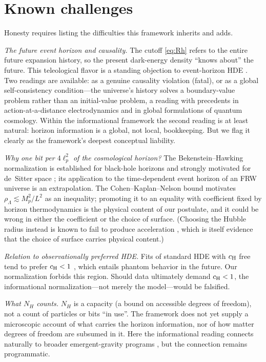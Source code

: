 \documentclass[11pt,a4paper]{article}
\begin{document}
\section{Known challenges}
\label{sec:challenges}

Honesty requires listing the difficulties this framework inherits and adds.

\emph{The future event horizon and causality.} The cutoff \eqref{eq:Rh}
refers to the entire future expansion history, so the present dark-energy
density ``knows about'' the future. This teleological flavor is a standing
objection to event-horizon HDE \citep{Cai2007,WangReview2017}. Two readings
are available: as a genuine causality violation (fatal), or as a global
self-consistency condition---the universe's history solves a boundary-value
problem rather than an initial-value problem, a reading with precedents in
action-at-a-distance electrodynamics and in global formulations of quantum
cosmology. Within the informational framework the second reading is at least
natural: horizon information is a global, not local, bookkeeping. But we
flag it clearly as the framework's deepest conceptual liability.

\emph{Why one bit per $4\ell_p^2$ of the cosmological horizon?} The
Bekenstein--Hawking normalization is established for black-hole horizons and
strongly motivated for de~Sitter space \citep{GibbonsHawking1977}; its
application to the time-dependent event horizon of an FRW universe is an
extrapolation. The Cohen--Kaplan--Nelson bound \citep{CKN1999} motivates
$\rho_\Lambda \lesssim M_p^2/L^2$ as an inequality; promoting it to an
equality with coefficient fixed by horizon thermodynamics is the physical
content of our postulate, and it could be wrong in either the coefficient or
the choice of surface. (Choosing the Hubble radius instead is known to fail
to produce acceleration \citep{Hsu2004}, which is itself evidence that the
choice of surface carries physical content.)

\emph{Relation to observationally preferred HDE.} Fits of standard HDE with
$c_{\rm H}$ free tend to prefer $c_{\rm H}<1$
\citep{HuangLi2004,WangReview2017}, which entails phantom behavior in the
future. Our normalization forbids this region. Should data ultimately
demand $c_{\rm H}<1$, the informational normalization---not merely the
model---would be falsified.

\emph{What $N_H$ counts.} $N_H$ is a capacity (a bound on accessible degrees
of freedom), not a count of particles or bits ``in use''. The framework does
not yet supply a microscopic account of what carries the horizon
information, nor of how matter degrees of freedom are subsumed in it. Here
the informational reading connects naturally to broader emergent-gravity
programs \citep{Padmanabhan2010,Verlinde2011}, but the connection remains
programmatic.
\end{document}
